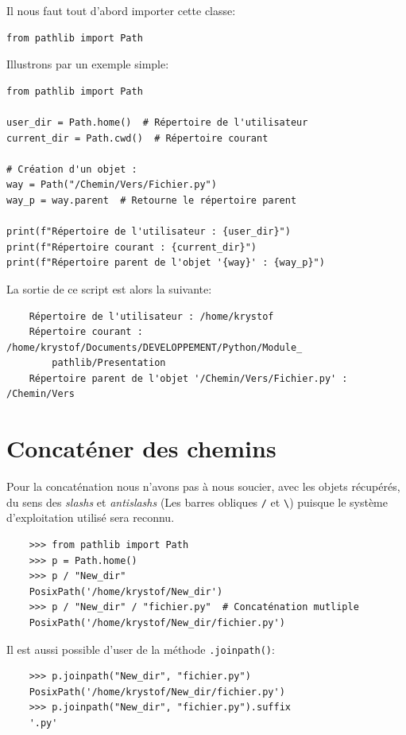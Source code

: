 \documentclass[a4paper,11pt]{book}
\begin{document}
Il nous faut tout d'abord importer cette classe:
\begin{lstlisting}[caption=Import de la classe \texttt{Path}]
from pathlib import Path
\end{lstlisting}
\medskip

Illustrons par un exemple simple:
\begin{lstlisting}[caption=Un premier script à l'aide du module \texttt{pathlib}]
from pathlib import Path

user_dir = Path.home()  # Répertoire de l'utilisateur
current_dir = Path.cwd()  # Répertoire courant

# Création d'un objet :
way = Path("/Chemin/Vers/Fichier.py")
way_p = way.parent  # Retourne le répertoire parent

print(f"Répertoire de l'utilisateur : {user_dir}")
print(f"Répertoire courant : {current_dir}")
print(f"Répertoire parent de l'objet '{way}' : {way_p}")
\end{lstlisting}
\medskip

La sortie de ce script est alors la suivante:
\begin{verbatim}
    Répertoire de l'utilisateur : /home/krystof
    Répertoire courant : /home/krystof/Documents/DEVELOPPEMENT/Python/Module_
        pathlib/Presentation
    Répertoire parent de l'objet '/Chemin/Vers/Fichier.py' : /Chemin/Vers
\end{verbatim}
\medskip

\section{Concaténer des chemins}
Pour la concaténation nous n'avons pas à nous soucier, avec les objets récupérés, du sens des \textit{slashs} et \textit{antislashs} (Les barres obliques \texttt{/} et \texttt{\textbackslash}) puisque le système d'exploitation utilisé sera reconnu.
\medskip
\begin{verbatim}
    >>> from pathlib import Path
    >>> p = Path.home()
    >>> p / "New_dir"
    PosixPath('/home/krystof/New_dir')
    >>> p / "New_dir" / "fichier.py"  # Concaténation mutliple
    PosixPath('/home/krystof/New_dir/fichier.py')
\end{verbatim}
\medskip

Il est aussi possible d'user de la méthode \texttt{.joinpath()}:
\begin{verbatim}
    >>> p.joinpath("New_dir", "fichier.py")
    PosixPath('/home/krystof/New_dir/fichier.py')
    >>> p.joinpath("New_dir", "fichier.py").suffix
    '.py'
\end{verbatim}
\medskip
\end{document}
